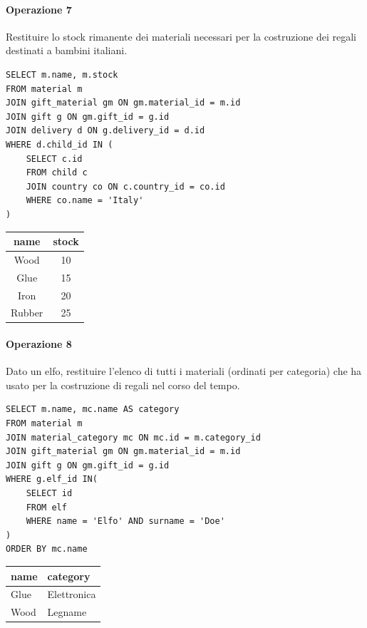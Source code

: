 \documentclass[12pt]{report}
\begin{document}
\paragraph{Operazione 7} Restituire lo stock rimanente dei materiali necessari per la costruzione dei regali destinati a bambini italiani.
\begin{lstlisting}
SELECT m.name, m.stock
FROM material m
JOIN gift_material gm ON gm.material_id = m.id
JOIN gift g ON gm.gift_id = g.id
JOIN delivery d ON g.delivery_id = d.id
WHERE d.child_id IN (
	SELECT c.id
 	FROM child c
  	JOIN country co ON c.country_id = co.id
   	WHERE co.name = 'Italy'
)
\end{lstlisting}
\begin{center}
\begin{tabular}{|c|c|}
  \hline
  name & stock \\ \hline
  Wood & 10 \\ \hline
  Glue & 15 \\ \hline
  Iron & 20 \\ \hline
  Rubber & 25 \\ \hline
\end{tabular}

\end{center}

\paragraph{Operazione 8} Dato un elfo, restituire l'elenco di tutti i materiali (ordinati per categoria) che ha usato per la costruzione di regali nel corso del tempo.
\begin{lstlisting}
SELECT m.name, mc.name AS category
FROM material m
JOIN material_category mc ON mc.id = m.category_id
JOIN gift_material gm ON gm.material_id = m.id
JOIN gift g ON gm.gift_id = g.id
WHERE g.elf_id IN(
	SELECT id
 	FROM elf
  	WHERE name = 'Elfo' AND surname = 'Doe'
)
ORDER BY mc.name
\end{lstlisting}
\begin{center}
\begin{tabular}{|l|l|}
\hline
name & category \\ \hline
Glue & Elettronica \\ \hline
Wood & Legname \\ \hline
\end{tabular}
\end{center}
\end{document}
